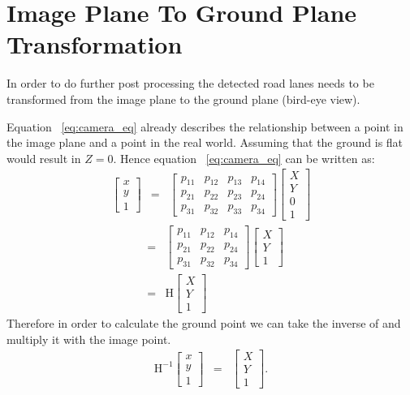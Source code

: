 \section{Image Plane To Ground Plane Transformation}
In order to do further post processing the detected road lanes needs to be 
transformed from the image plane to the ground plane (bird-eye view). 

Equation ~\ref{eq:camera_eq} already describes the relationship between a point in 
the image plane and a point in the real world. Assuming that the ground is flat 
would result in $Z = 0$. Hence equation ~\ref{eq:camera_eq} can be written as: 
\begin{eqnarray*}
\begin{bmatrix}x\\y\\1\end{bmatrix} & = & 
\begin{bmatrix}
p_{11} & p_{12} & p_{13} & p_{14} \\
p_{21} & p_{22} & p_{23} & p_{24} \\
p_{31} & p_{32} & p_{33} & p_{34}
\end{bmatrix}
\begin{bmatrix}X\\Y\\0\\1\end{bmatrix}
\end{eqnarray*}
\begin{eqnarray*}
& = & \begin{bmatrix}
        p_{11} & p_{12} & p_{14} \\
        p_{21} & p_{22} & p_{24} \\
        p_{31} & p_{32} & p_{34}                                            
\end{bmatrix}\begin{bmatrix}X\\Y\\1\end{bmatrix}\\
                                      & = & 
\mathrm{H}\begin{bmatrix}X\\Y\\1\end{bmatrix}
\end{eqnarray*}
Therefore in order to calculate the ground point we can take the inverse of and 
multiply it with the image point. 
\begin{eqnarray*}
\mathrm{H}^{-1} \begin{bmatrix}x\\y\\1\end{bmatrix} & = & 
\begin{bmatrix}X\\Y\\1\end{bmatrix}.
\end{eqnarray*}

